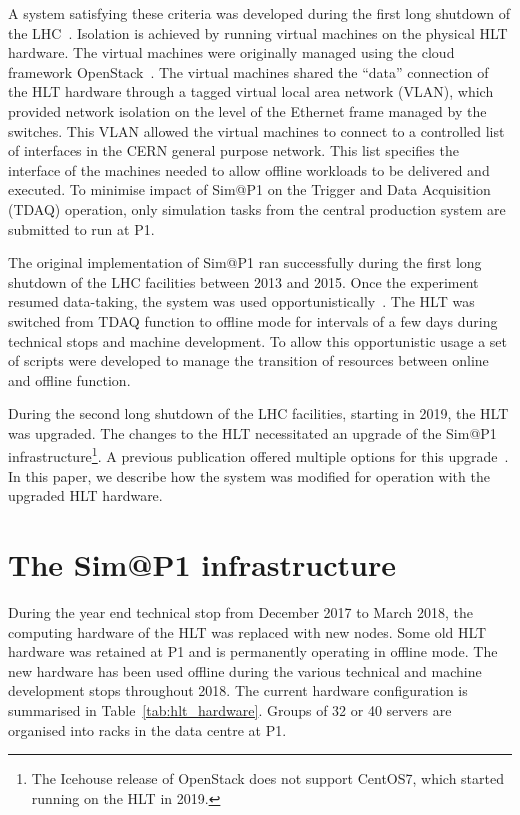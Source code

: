 \documentclass{webofc}
\begin{document}
A system satisfying these criteria was developed during the first long shutdown
of the LHC~\cite{Ballestrero:2015ypa}. Isolation is achieved by running virtual
machines on the physical HLT hardware. The virtual machines were originally
managed using the cloud framework OpenStack~\cite{openstack}. The virtual
machines shared the ``data'' connection of the HLT hardware through a tagged
virtual local area network (VLAN), which provided network isolation on the level
of the Ethernet frame managed by the switches. This VLAN allowed the virtual
machines to connect to a controlled list of interfaces in the CERN general
purpose network. This list specifies the interface of the machines needed to
allow offline workloads to be delivered and executed. To minimise impact of
Sim@P1 on the Trigger and Data Acquisition (TDAQ) operation, only simulation
tasks from the central production system are submitted to run at P1.

The original implementation of Sim@P1 ran successfully during the first long
shutdown of the LHC facilities between 2013 and 2015. Once the experiment
resumed data-taking, the system was used
opportunistically~\cite{Ballestrero:2017psv}. The HLT was switched from TDAQ
function to offline mode for intervals of a few days during technical stops and
machine development. To allow this opportunistic usage a set of scripts were
developed to manage the transition of resources between online and offline
function.

During the second long shutdown of the LHC facilities, starting in 2019, the HLT
was upgraded. The changes to the HLT necessitated an upgrade of the Sim@P1
infrastructure\footnote{The Icehouse release of OpenStack does not support
CentOS7, which started running on the HLT in 2019.}. A previous
publication offered multiple options for this upgrade~\cite{Berghaus:2019wuj}.
In this paper, we describe how the system was modified for operation with the
upgraded HLT hardware.

\section{The Sim@P1 infrastructure}
\label{sec:infra}
During the year end technical stop from December 2017 to March 2018, the
computing hardware of the HLT was replaced with new nodes. Some old HLT hardware
was retained at P1 and is permanently operating in offline mode. The new
hardware has been used offline during the various technical and machine
development stops throughout 2018. The current hardware configuration is
summarised in Table~\ref{tab:hlt_hardware}. Groups of 32 or 40 servers are
organised into racks in the data centre at P1.
\end{document}

